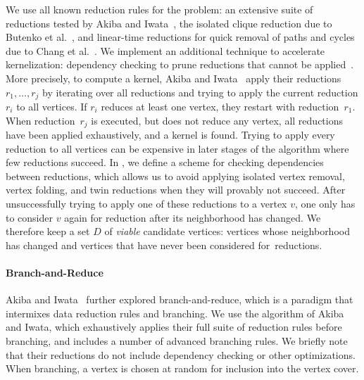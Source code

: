 \documentclass[a4paper,UKenglish]{lipics-v2016}
\begin{document}
We use all known reduction rules for the problem: an extensive suite of reductions tested by Akiba and Iwata~\cite{akiba-tcs-2016}, the isolated clique reduction due to Butenko et al.~\cite{}, and linear-time reductions for quick removal of paths and cycles due to Chang et al.~\cite{chang2017computing}. We implement an additional technique to accelerate kernelization: dependency checking to prune reductions that cannot be applied~\cite{DBLP:conf/alenex/Hespe0S18}.
More precisely, to compute a kernel, Akiba and Iwata~\cite{akiba-tcs-2016} apply their
reductions~$r_1, \dots ,r_j$ by iterating over all reductions and trying to
apply the current reduction $r_i$ to all vertices. If $r_i$ reduces at
least one vertex, they restart with reduction~$r_1$. When reduction~$r_j$ 
is executed, but does not reduce any vertex, all reductions have been applied
exhaustively, and a kernel is found. Trying to apply every reduction to all
vertices can be expensive in later stages of the algorithm where 
few reductions succeed. 
In \cite{DBLP:conf/alenex/Hespe0S18}, we define a scheme for checking dependencies between reductions, which allows us to
avoid applying isolated vertex removal, vertex folding, and twin reductions when they
will provably not succeed. After unsuccessfully trying to apply one
of these reductions to a vertex $v$, one only has to consider $v$ again for reduction
after its neighborhood has changed. We therefore keep a
set $D$ of \emph{viable} candidate vertices: vertices whose neighborhood has changed
and vertices that have never been considered for~reductions.


\paragraph*{Branch-and-Reduce}
Akiba and Iwata~\cite{akiba-tcs-2016} further explored branch-and-reduce, which is a paradigm that intermixes data reduction rules and branching. We use the algorithm of Akiba and Iwata, which exhaustively applies their full suite of reduction rules before branching, and includes a number of advanced branching rules. We briefly note that their reductions do not include dependency checking or other optimizations. When branching, a vertex is chosen at random for inclusion into the vertex cover.
\end{document}
